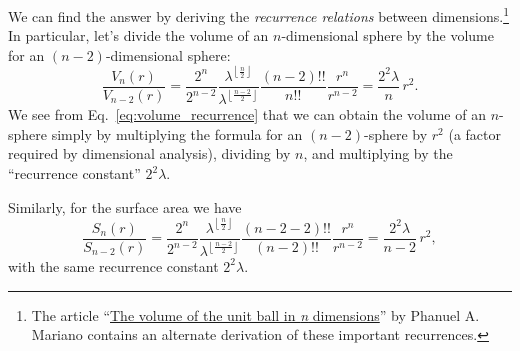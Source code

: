 We can find the answer by deriving the \emph{recurrence relations} between dimensions.\footnote{The article ``\href{http://www2.math.uconn.edu/~mariano/research/MathClubsp14\%20.pdf}{The volume of the unit ball in \emph{n} dimensions}'' by Phanuel A. Mariano contains an alternate derivation of these important recurrences.} In particular, let's divide the volume of an $n$-dimensional sphere by the volume for an $(n-2)$-dimensional sphere:
\begin{equation}
\label{eq:volume_recurrence}
\frac{V_n(r)}{V_{n-2}(r)} =
\frac{2^n}{2^{n-2}}
\frac{\lambda^{\left\lfloor \frac{n}{2} \right\rfloor}}{\lambda^{\left\lfloor \frac{n-2}{2} \right\rfloor}}
\frac{(n-2)!!}{n!!}
\frac{r^{n}}{r^{n-2}}
=
\frac{2^2\lambda}{n}\,r^2.
\end{equation}
We see from Eq.~\eqref{eq:volume_recurrence} that we can obtain the volume of an $n$-sphere simply by multiplying the formula for an $(n-2)$-sphere by $r^2$ (a factor required by dimensional analysis), dividing by $n$, and multiplying by the ``recurrence constant'' $2^2\lambda$.

Similarly, for the surface area we have
\begin{equation}
\label{eq:surface_area_recurrence}
\frac{S_n(r)}{S_{n-2}(r)} =
\frac{2^n}{2^{n-2}}
\frac{\lambda^{\left\lfloor \frac{n}{2} \right\rfloor}}{\lambda^{\left\lfloor \frac{n-2}{2} \right\rfloor}}
\frac{(n-2-2)!!}{(n-2)!!}
\frac{r^{n}}{r^{n-2}}
=
\frac{2^2\lambda}{n-2}\,r^2,
\end{equation}
with the same recurrence constant $2^2\lambda$.

